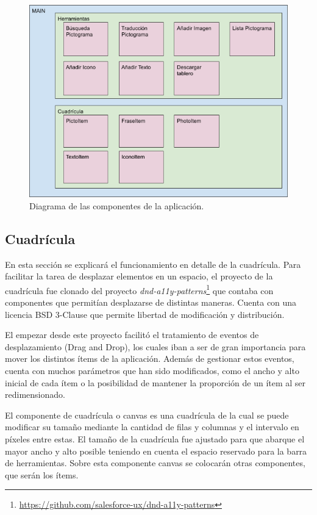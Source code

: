 \begin{figure}[h!]
	\centering
	\includegraphics[width=\linewidth]{Imagenes/Bitmap/diagramaarquitectura}
	\caption{Diagrama de las componentes de la aplicación.}
	\label{fig:diagramaarquitectura}
\end{figure}


\subsection{Cuadrícula}
\label{cap5:cuadricula}

En esta sección se explicará el funcionamiento en detalle de la cuadrícula. Para facilitar la tarea de desplazar elementos en un espacio, el proyecto de la cuadrícula fue clonado del proyecto  \textit{dnd-a11y-patterns}\footnote{\url{https://github.com/salesforce-ux/dnd-a11y-patterns}} que contaba con componentes que permitían desplazarse de distintas maneras. Cuenta con una licencia BSD 3-Clause que permite libertad de modificación y distribución.


El empezar desde este proyecto facilitó el  tratamiento de eventos de desplazamiento (Drag and Drop), los cuales iban a ser de gran importancia para mover los distintos ítems de la aplicación. Además de gestionar estos eventos, cuenta con muchos parámetros que han sido modificados, como el ancho y alto inicial de cada ítem o la posibilidad de mantener la proporción de un ítem al ser redimensionado.

El componente de cuadrícula o canvas es una cuadrícula de la cual se puede modificar su tamaño mediante la cantidad de filas y columnas y el intervalo en píxeles entre estas. El tamaño de la cuadrícula fue ajustado para que abarque el mayor ancho y alto posible teniendo en cuenta el espacio reservado para la barra de herramientas. Sobre esta componente canvas se colocarán otras componentes, que serán los ítems. 

